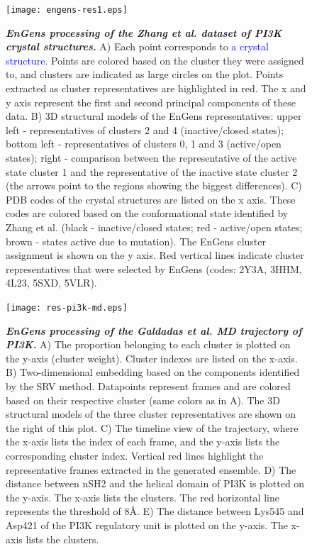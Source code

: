 \documentclass[unnumsec,webpdf,contemporary,large,numsquare]{oup-authoring-template}%
\theoremstyle{thmstyleone}%
\theoremstyle{thmstyletwo}%
\theoremstyle{thmstylethree}%
\begin{document}
\begin{figure}[!t]%
\centering
{\texttt{[image: engens-res1.eps]}}
\caption{\textbf{\textit{EnGens processing of the  Zhang et al. dataset of PI3K crystal structures.}} A) Each point corresponds to \textcolor{blue}{a crystal structure}. Points are colored based on the cluster they were assigned to, and clusters are indicated as large circles on the plot. Points extracted as cluster representatives are highlighted in red. The x and y axis represent the first and second principal components of these data. B) 3D structural models of the EnGens representatives:  upper left - representatives of clusters 2 and 4 (inactive/closed states); bottom left - representatives of clusters 0, 1 and 3  (active/open states); right - comparison between the representative of the active state cluster 1 and the representative of the inactive state cluster 2 (the arrows point to the regions showing the biggest differences). C) PDB codes of the crystal structures are listed on the x axis. These codes are colored based on the conformational state identified by Zhang et al. (black - inactive/closed states; red - active/open states; brown - states active due to mutation). The EnGens cluster assignment is shown on the y axis. Red vertical lines indicate cluster representatives that were selected by EnGens (codes: 2Y3A, 3HHM, 4L23, 5SXD, 5VLR).}\label{fig-res1a}
\end{figure}


\begin{figure}[!t]%
\centering
{\texttt{[image: res-pi3k-md.eps]}}
\caption{\textbf{\textit{EnGens processing of the Galdadas et al. MD trajectory of PI3K.}} A) The proportion belonging to each cluster is plotted on the y-axis (cluster weight). Cluster indexes are listed on the x-axis. B) Two-dimensional embedding based on the components identified by the SRV method. Datapoints represent frames and are colored based on their respective cluster (same colors as in A). The 3D structural models of the three cluster representatives are shown on the right of this plot. C) The timeline view of the trajectory, where the x-axis lists  the index of each frame, and the y-axis lists the corresponding cluster index. Vertical red lines highlight the representative frames extracted in the generated ensemble. D) The distance between nSH2 and the helical domain of PI3K is plotted on the y-axis. The x-axis lists the clusters. The red horizontal line represents the threshold of 8Å.  E) The distance between Lys545 and Asp421 of the PI3K regulatory unit is plotted on the y-axis. The x-axis lists the clusters.}\label{fig-res1b}
\end{figure}
\end{document}
